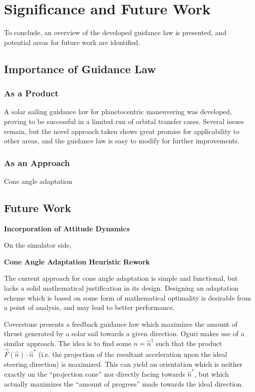 \chapter{Significance and Future Work}

To conclude, an overview of the developed guidance law is presented, and potential areas for future work are identified.


\section{Importance of Guidance Law}

\subsection{As a Product}
A solar sailing guidance law for planetocentric maneuvering was developed, proving to be successful in a limited run of orbital transfer cases. Several issues remain, but the novel approach taken shows great promise for applicability to other areas, and the guidance law is easy to modify for further improvements.

\subsection{As an Approach}
Cone angle adaptation



\section{Future Work}


\textbf{Incorporation of Attitude Dynamics}

On the simulator side,

\textbf{Cone Angle Adaptation Heuristic Rework}

The current approach for cone angle adaptation is simple and functional, but lacks a solid mathematical justification in its design. Designing an adaptation scheme which is based on some form of mathematical optimality is desirable from a point of analysis, and may lead to better performance.

Coverstone \cite{coverstone2003technique} presents a feedback guidance law which maximizes the amount of thrust generated by a solar sail towards a given direction. Oguri \cite{oguri2023solar} makes use of a similar approach. The idea is to find some \(\hat{n} = \hat{n}^\dagger\) such that the product \(\vec{F}(\hat{n}) \cdot \hat{n}^*\) (i.e. the projection of the resultant acceleration upon the ideal steering direction) is maximized. This can yield an orientation which is neither exactly on the ``projection cone'' nor directly facing towards \(\hat{n}^*\), but which actually maximizes the ``amount of progress'' made towards the ideal direction.




